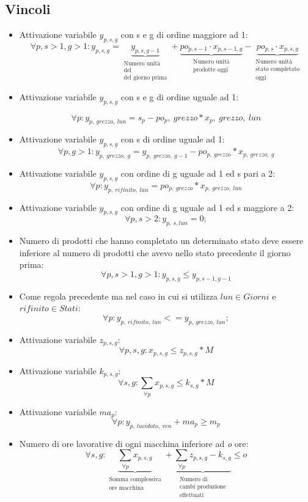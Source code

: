 \documentclass[12pt]{article}
\begin{document}
	\subsection{Vincoli}
	\begin{itemize}
		\item Attivazione variabile \( y_{p,s,g} \) con s e g di ordine maggiore ad 1:
		$$
			\forall p,s>1,g>1:y_{p,s,g}= 
			\underbrace{y_{p,s,g-1}}_{ \substack{\textrm{Numero unità }\\ \textrm{del} \\ \textrm{del giorno prima}}}
			+
			\underbrace{po_{p,s-1} \cdot x_{p,s-1,g}}_{\substack{\textrm{Numero unità}\\ \textrm{prodotte oggi}}}
			-
			\underbrace{po_{p,s} \cdot x_{p,s,g}}_{\substack{\textrm{Numero unità }\\ \textrm{stato completato} \\ \textrm{oggi}}}
		$$
		\item Attivazione variabile \( y_{p,s,g} \) con s e g di ordine uguale ad 1:

		$$
			\forall p : y_{p,\ grezzo,\ lun}=s_p-po_p,\ grezzo * x_p,\ grezzo,\ lun
		$$
		\item Attivazione variabile \( y_{p,s,g} \) con s di ordine uguale ad 1:
		$$
			\forall p,g>1 :
			y_{p,\ grezzo,\ g}=y_{p,\ grezzo,\ g-1}-po_{p,\ grezzo}*x_{p,\ grezzo,\ g}
		$$
		\item Attivazione variabile \( y_{p,s,g} \) con ordine di g uguale ad 1 ed s pari a 2:
		$$
		\forall p : y_{p,\ rifinito,\ lun}=po_{p,\ grezzo}* x_{p,\ grezzo,\ lun}
		$$
		\item Attivazione variabile \( y_{p,s,g} \) con ordine di g uguale ad 1 ed s maggiore a 2:
		$$
		\forall p,s>2 : y_{p,\ s, lun}=0;
		$$
		\item Numero di prodotti che hanno completato un determinato stato deve essere inferiore al numero di prodotti che avevo nello stato precedente il giorno prima:
		$$
			\forall p,s>1,g>1 : y_{p,s,g} \leq y_{p,s-1,g-1}
		$$
		\item Come regola precedente ma nel caso in cui si utilizza \(lun \in Giorni\) e \(rifinito \in Stati\):
		$$
		\forall p : y_{p,\ rifinito,\ lun}<=y_{p,\ grezzo,\ lun};
		$$
		\item Attivazione variabile \( z_{p,s,g} \):
		$$
			\forall p,s,g : x_{p,s,g}\leq z_{p,s,g}*M
		$$
		\item Attivazione variabile \( k_{p,s,g} \):
		$$
			\forall s,g : \sum\limits_{\forall p} x_{p,s,g}\leq k_{s,g}*M
		$$
		\item Attivazione variabile \(ma_p\):
		$$
			\forall p : y_{p,\ lucidato,\ ven}+ma_p \geq m_p
		$$
		\item Numero di ore lavorative di ogni macchina inferiore ad \emph{o} ore:
		$$
			\forall s,g : 
			\underbrace{\sum\limits_{\forall p}x_{p,s,g}}_{\substack{\textrm{Somma complessiva}\\ \textrm{ore macchina}}}
			+
			\underbrace{\sum\limits_{\forall p}z_{p,s,g}-k_{s,g}}_{\substack{\textrm{Numero di}\\ \textrm{cambi produzione} \\ \textrm{effettuati}}}
			\leq o
		$$
	\end{itemize}
\pagebreak
\end{document}

